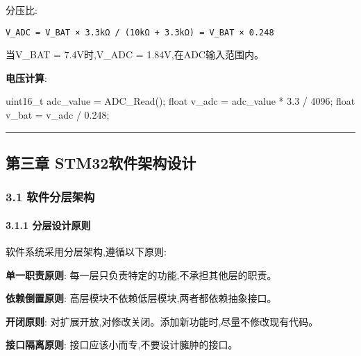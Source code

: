 \documentclass[
]{article}
\newenvironment{Shaded}{}{}
\newcommand{\DataTypeTok}[1]{\textcolor[rgb]{0.56,0.13,0.00}{#1}}
\newcommand{\DecValTok}[1]{\textcolor[rgb]{0.25,0.63,0.44}{#1}}
\newcommand{\FloatTok}[1]{\textcolor[rgb]{0.25,0.63,0.44}{#1}}
\newcommand{\NormalTok}[1]{#1}
\begin{document}
分压比:

\begin{verbatim}
V_ADC = V_BAT × 3.3kΩ / (10kΩ + 3.3kΩ) = V_BAT × 0.248
\end{verbatim}

当V\_BAT = 7.4V时,V\_ADC = 1.84V,在ADC输入范围内。

\textbf{电压计算}:

\begin{Shaded}
\begin{Highlighting}[]
\DataTypeTok{uint16\_t}\NormalTok{ adc\_value = ADC\_Read();}
\DataTypeTok{float}\NormalTok{ v\_adc = adc\_value * }\FloatTok{3.3}\NormalTok{ / }\DecValTok{4096}\NormalTok{;}
\DataTypeTok{float}\NormalTok{ v\_bat = v\_adc / }\FloatTok{0.248}\NormalTok{;}
\end{Highlighting}
\end{Shaded}

\begin{center}\rule{0.5\linewidth}{0.5pt}\end{center}

\hypertarget{ux7b2cux4e09ux7ae0-stm32ux8f6fux4ef6ux67b6ux6784ux8bbeux8ba1}{%
\subsection{第三章
STM32软件架构设计}\label{ux7b2cux4e09ux7ae0-stm32ux8f6fux4ef6ux67b6ux6784ux8bbeux8ba1}}

\hypertarget{ux8f6fux4ef6ux5206ux5c42ux67b6ux6784}{%
\subsubsection{3.1
软件分层架构}\label{ux8f6fux4ef6ux5206ux5c42ux67b6ux6784}}

\hypertarget{ux5206ux5c42ux8bbeux8ba1ux539fux5219}{%
\paragraph{3.1.1
分层设计原则}\label{ux5206ux5c42ux8bbeux8ba1ux539fux5219}}

软件系统采用分层架构,遵循以下原则:

\textbf{单一职责原则}: 每一层只负责特定的功能,不承担其他层的职责。

\textbf{依赖倒置原则}: 高层模块不依赖低层模块,两者都依赖抽象接口。

\textbf{开闭原则}:
对扩展开放,对修改关闭。添加新功能时,尽量不修改现有代码。

\textbf{接口隔离原则}: 接口应该小而专,不要设计臃肿的接口。
\end{document}

